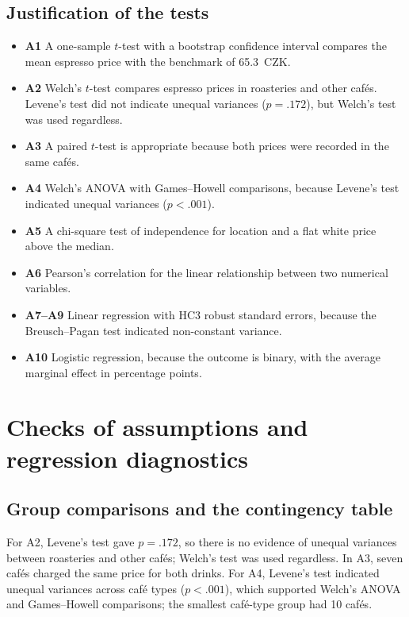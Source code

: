 \documentclass[11pt,a4paper]{article}
\begin{document}
\subsection{Justification of the tests}

\begin{itemize}
  \item \textbf{A1} A one-sample $t$-test with a bootstrap confidence interval compares the mean espresso price with the benchmark of 65.3~CZK.
  \item \textbf{A2} Welch's $t$-test compares espresso prices in roasteries and other caf\'es. Levene's test did not indicate unequal variances ($p = .172$), but Welch's test was used regardless.
  \item \textbf{A3} A paired $t$-test is appropriate because both prices were recorded in the same caf\'es.
  \item \textbf{A4} Welch's ANOVA with Games--Howell comparisons, because Levene's test indicated unequal variances ($p < .001$).
  \item \textbf{A5} A chi-square test of independence for location and a flat white price above the median.
  \item \textbf{A6} Pearson's correlation for the linear relationship between two numerical variables.
  \item \textbf{A7--A9} Linear regression with HC3 robust standard errors, because the Breusch--Pagan test indicated non-constant variance.
  \item \textbf{A10} Logistic regression, because the outcome is binary, with the average marginal effect in percentage points.
\end{itemize}

\section{Checks of assumptions and regression diagnostics}\label{app:diag}

\subsection{Group comparisons and the contingency table}

For A2, Levene's test gave $p = .172$, so there is no evidence of unequal variances between roasteries and other caf\'es; Welch's test was used regardless. In A3, seven caf\'es charged the same price for both drinks. For A4, Levene's test indicated unequal variances across caf\'e types ($p < .001$), which supported Welch's ANOVA and Games--Howell comparisons; the smallest caf\'e-type group had 10 caf\'es.
\end{document}
